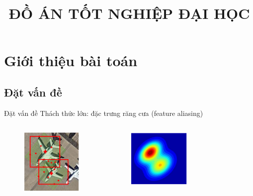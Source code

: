 \documentclass[11pt]{beamer}
\title[ \footnotesize  \textcolor{red}{\bf Đồ án tốt nghiệp} -- \textcolor{blue}{Trần Xuân Độ }]{\Large  \bf ĐỒ ÁN TỐT NGHIỆP ĐẠI HỌC}
\institute{\bf  Hà Nội, tháng 12 năm 2023}
\theoremstyle{definition}
\theoremstyle{plain}
\theoremstyle{plain}
\theoremstyle{remark}
\begin{document}

	\section{Giới thiệu bài toán}
	\subsection{Đặt vấn đề}
	\begin{frame}{Đặt vấn đề}
			Thách thức lớn: đặc trưng răng cưa (feature aliasing)
			\begin{columns}[c] %
			\begin{figure}
				\centering
				\includegraphics[width=3cm]{reppoint_bouding_box.jpg}
		
			\end{figure}
			\begin{figure}
				\centering
				\includegraphics[width=3cm]{reception_field_w_aliasing.jpg}
			
			\end{figure}
		\end{columns}
	\end{frame}
	
\end{document}

